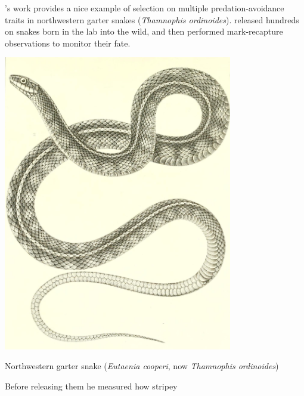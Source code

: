 \citet{brodie1992correlational}'s work provides a nice example of
selection on multiple predation-avoidance traits in northwestern garter snakes
({\it Thamnophis ordinoides}). \citeauthor{brodie1992correlational} released hundreds on snakes born in
the lab into the wild, and then performed mark-recapture observations
to monitor their fate.
\begin{marginfigure}
\begin{center} 
\includegraphics[width= 0.75\textwidth]{illustration_images/Quant_gen/Garter_snake/Eutaenia_cooperi.jpg}
\end{center}
\caption{Northwestern garter snake ({\it Eutaenia cooperi}, now {\it
    Thamnophis ordinoides})
 } \label{fig:Garter_snake}
\end{marginfigure}  Before releasing them he measured how stripey
